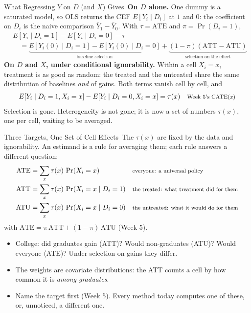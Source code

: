 \documentclass[aspectratio=169,11pt,xcolor=dvipsnames]{beamer}
\newcommand{\E}{E}
\newcommand{\core}{\,\raisebox{0.6pt}{\textcolor{corestar}{$\bigstar$}}}
\begin{document}
\begin{frame}{What Regressing $Y$ on $D$ (and $X$) Gives\core}
\textbf{On $D$ alone.} One dummy is a saturated model, so OLS returns the CEF
$\E[Y_i\mid D_i]$ at $1$ and $0$: the coefficient on $D_i$ is the naive
comparison $\bar Y_1-\bar Y_0$. With $\tau=\text{ATE}$ and $\pi=\Pr(D_i=1)$,
\begin{align*}
  &\E[Y_i\mid D_i = 1]-\E[Y_i\mid D_i = 0] - \tau \\
  &\quad = \underbrace{\E[Y_i(0)\mid D_i = 1]-\E[Y_i(0)\mid D_i = 0]}_{\text{baseline selection}}
  + \underbrace{(1-\pi)(\text{ATT}-\text{ATU})}_{\text{selection on the effect}}
\end{align*}
\vskip2pt
\textbf{On $D$ and $X$, under conditional ignorability.} Within a cell
$X_i=x$, treatment is as good as random: the treated and the untreated share
the same distribution of baselines \emph{and} of gains. Both terms vanish cell
by cell, and
\begin{align*}
  \E[Y_i\mid D_i = 1,X_i = x]-\E[Y_i\mid D_i = 0,X_i = x] = \tau(x)
  && \text{\footnotesize Week 5's CATE$(x)$}
\end{align*}
Selection is gone. Heterogeneity is not gone; it is now a set of numbers
$\tau(x)$, one per cell, waiting to be averaged.
\end{frame}

\begin{frame}{Three Targets, One Set of Cell Effects\core}
The $\tau(x)$ are fixed by the data and ignorability. An estimand is a rule for
averaging them; each rule answers a different question:
\vspace{-3pt}
\begin{align*}
  \text{ATE} &= \sum_x \tau(x)\,\Pr(X_i = x)
  && \text{\footnotesize everyone: a universal policy} \\
  \text{ATT} &= \sum_x \tau(x)\,\Pr(X_i = x \mid D_i = 1)
  && \text{\footnotesize the treated: what treatment did for them} \\
  \text{ATU} &= \sum_x \tau(x)\,\Pr(X_i = x \mid D_i = 0)
  && \text{\footnotesize the untreated: what it would do for them}
\end{align*}
with $\text{ATE} = \pi\,\text{ATT} + (1-\pi)\,\text{ATU}$ (Week 5).
\begin{itemize}\itemsep1pt\small
  \item College: did graduates gain (ATT)? Would non-graduates (ATU)? Would
        everyone (ATE)? Under selection on gains they differ.
  \item The weights are covariate distributions: the ATT counts a cell by how
        common it is \emph{among graduates}.
  \item Name the target first (Week 5). Every method today computes one of
        these, or, unnoticed, a different one.
\end{itemize}
\end{frame}
\end{document}
